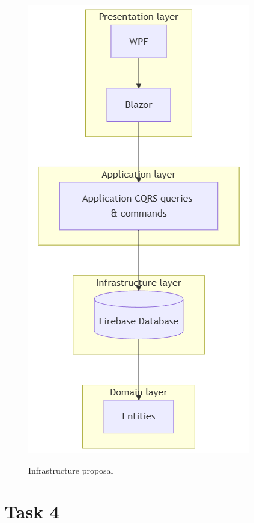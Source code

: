 \documentclass{article}
\begin{document}
\begin{figure}[t!]
  \includegraphics{images/infrastructure-proposal.png}
  \label{Infrastructure proposal}
  \caption{Infrastructure proposal}
\end{figure}
\clearpage

\section{Task 4}
\end{document}
